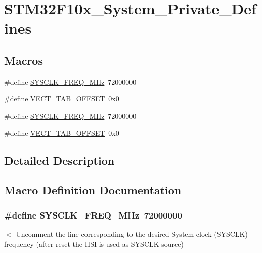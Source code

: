 \hypertarget{group___s_t_m32_f10x___system___private___defines}{}\section{S\+T\+M32\+F10x\+\_\+\+System\+\_\+\+Private\+\_\+\+Defines}
\label{group___s_t_m32_f10x___system___private___defines}
\subsection*{Macros}
\begin{DoxyCompactItemize}
\item 
\#define \hyperlink{group___s_t_m32_f10x___system___private___defines_ga69649cc38f34627cfb48b51062ebd390}{S\+Y\+S\+C\+L\+K\+\_\+\+F\+R\+E\+Q\+\_\+M\+Hz}~72000000
\item 
\#define \hyperlink{group___s_t_m32_f10x___system___private___defines_ga40e1495541cbb4acbe3f1819bd87a9fe}{V\+E\+C\+T\+\_\+\+T\+A\+B\+\_\+\+O\+F\+F\+S\+ET}~0x0
\item 
\#define \hyperlink{group___s_t_m32_f10x___system___private___defines_ga69649cc38f34627cfb48b51062ebd390}{S\+Y\+S\+C\+L\+K\+\_\+\+F\+R\+E\+Q\+\_\+M\+Hz}~72000000
\item 
\#define \hyperlink{group___s_t_m32_f10x___system___private___defines_ga40e1495541cbb4acbe3f1819bd87a9fe}{V\+E\+C\+T\+\_\+\+T\+A\+B\+\_\+\+O\+F\+F\+S\+ET}~0x0
\end{DoxyCompactItemize}


\subsection{Detailed Description}


\subsection{Macro Definition Documentation}
\subsubsection[{\texorpdfstring{S\+Y\+S\+C\+L\+K\+\_\+\+F\+R\+E\+Q\+\_\+72\+M\+Hz}{SYSCLK_FREQ_72MHz}}]{\setlength{\rightskip}{0pt plus 5cm}\#define S\+Y\+S\+C\+L\+K\+\_\+\+F\+R\+E\+Q\+\_\+M\+Hz~72000000}\hypertarget{group___s_t_m32_f10x___system___private___defines_ga69649cc38f34627cfb48b51062ebd390}{}\label{group___s_t_m32_f10x___system___private___defines_ga69649cc38f34627cfb48b51062ebd390}
$<$ Uncomment the line corresponding to the desired System clock (S\+Y\+S\+C\+LK) frequency (after reset the H\+SI is used as S\+Y\+S\+C\+LK source)

